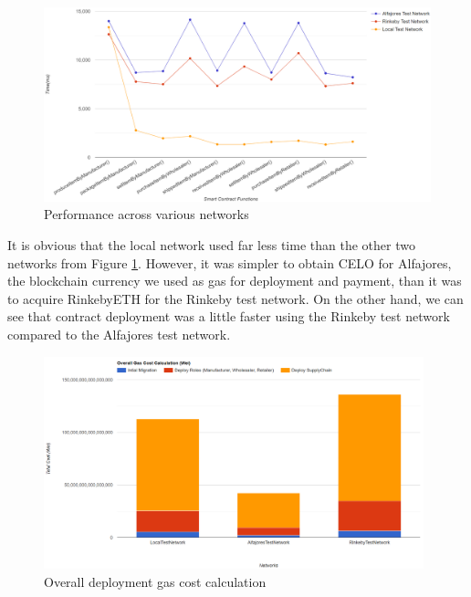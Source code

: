 \vspace{.5cm}

\begin{figure}[h]
\centering
  \includegraphics[width=15cm]{includes/figures/graph.png} 
  \caption{Performance across various networks}
  \label{Testing on networks}
\end{figure}

\vspace{.5cm}

It is obvious that the local network used far less time than the other two networks from Figure \ref{Testing on networks}. However, it was simpler to obtain CELO for Alfajores, the blockchain currency we used as gas for deployment and payment, than it was to acquire RinkebyETH for the Rinkeby test network. On the other hand, we can see that contract deployment was a little faster using the Rinkeby test network compared to the Alfajores test network.


\begin{figure}[h]
\centering
  \includegraphics[width=11cm]{includes/figures/totalCost.png} 
  \caption{Overall deployment gas cost calculation }
  \label{Overall Gas Cost calculation}
\end{figure}

\vspace{.5cm}

